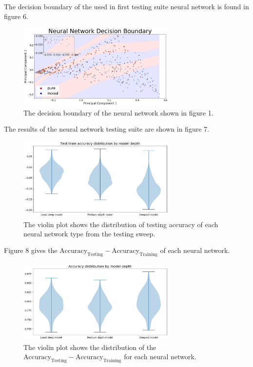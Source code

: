 \documentclass[12pt]{article}
\begin{document}
The decision boundary of the used in first testing suite neural network is found in figure 6. 
\begin{figure}[H]
\centering
\includegraphics[width=0.7\textwidth]{decboundary}
\caption{The decision boundary of the neural network shown in figure 1.}
\end{figure}
The results of the neural network testing suite are shown in figure 7. 
\begin{figure}[H]
\centering
\includegraphics[width=0.7\textwidth]{testOut1289}
\caption{The violin plot shows the distribution of testing accuracy of each neural network type from the testing sweep.}
\end{figure}
Figure 8 gives the $\text{Accuracy}_{\text{Testing}} - \text{Accuracy}_{\text{Training}}$ of each neural network. 
\begin{figure}[H]
\centering
\includegraphics[width=0.7\textwidth]{testOut128}
\caption{The violin plot shows the distribution of the $\text{Accuracy}_{\text{Testing}} - \text{Accuracy}_{\text{Training}}$
for each neural network. }
\end{figure}
\end{document}
